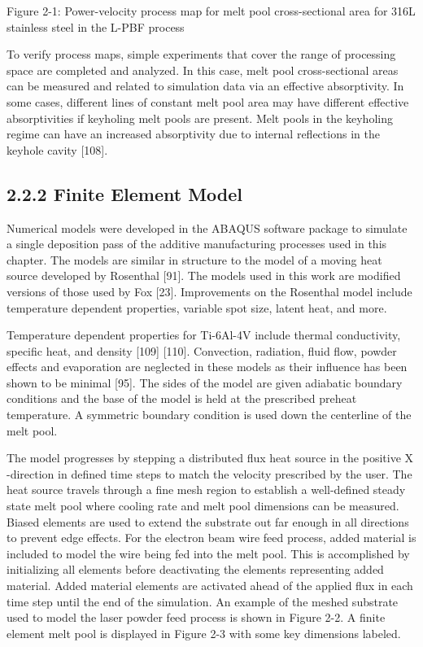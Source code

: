 \documentclass[10pt]{article}
\begin{document}
Figure 2-1: Power-velocity process map for melt pool cross-sectional area for 316L stainless steel in the L-PBF process

To verify process maps, simple experiments that cover the range of processing space are completed and analyzed. In this case, melt pool cross-sectional areas can be measured and related to simulation data via an effective absorptivity. In some cases, different lines of constant melt pool area may have different effective absorptivities if keyholing melt pools are present. Melt pools in the keyholing regime can have an increased absorptivity due to internal reflections in the keyhole cavity [108].

\subsection*{2.2.2 Finite Element Model}
Numerical models were developed in the ABAQUS software package to simulate a single deposition pass of the additive manufacturing processes used in this chapter. The models are similar in structure to the model of a moving heat source developed by Rosenthal [91]. The models used in this work are modified versions of those used by Fox [23]. Improvements on the Rosenthal model include temperature dependent properties, variable spot size, latent heat, and more.

Temperature dependent properties for Ti-6Al-4V include thermal conductivity, specific heat, and density [109] [110]. Convection, radiation, fluid flow, powder effects and evaporation are neglected in these models as their influence has been shown to be minimal [95]. The sides of the model are given adiabatic boundary conditions and the base of the model is held at the prescribed preheat temperature. A symmetric boundary condition is used down the centerline of the melt pool.

The model progresses by stepping a distributed flux heat source in the positive $\mathrm{X}$-direction in defined time steps to match the velocity prescribed by the user. The heat source travels through a fine mesh region to establish a well-defined steady state melt pool where cooling rate and melt pool dimensions can be measured. Biased elements are used to extend the substrate out far enough in all directions to prevent edge effects. For the electron beam wire feed process, added material is included to model the wire being fed into the melt pool. This is accomplished by initializing all elements before deactivating the elements representing added material. Added material elements are activated ahead of the applied flux in each time step until the end of the simulation. An example of the meshed substrate used to model the laser powder feed process is shown in Figure 2-2. A finite element melt pool is displayed in Figure 2-3 with some key dimensions labeled.
\end{document}
